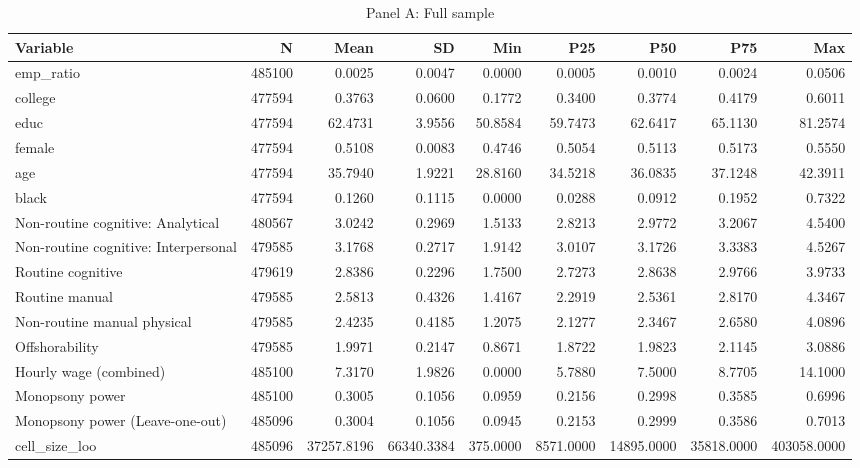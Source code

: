 \begin{table}

\caption{Panel A: Full sample}
\centering
\begin{tabular}[t]{lrrrrrrrr}
\toprule
Variable & N & Mean & SD & Min & P25 & P50 & P75 & Max\\
\midrule
emp\_ratio & 485100 & 0.0025 & 0.0047 & 0.0000 & 0.0005 & 0.0010 & 0.0024 & 0.0506\\
college & 477594 & 0.3763 & 0.0600 & 0.1772 & 0.3400 & 0.3774 & 0.4179 & 0.6011\\
educ & 477594 & 62.4731 & 3.9556 & 50.8584 & 59.7473 & 62.6417 & 65.1130 & 81.2574\\
female & 477594 & 0.5108 & 0.0083 & 0.4746 & 0.5054 & 0.5113 & 0.5173 & 0.5550\\
age & 477594 & 35.7940 & 1.9221 & 28.8160 & 34.5218 & 36.0835 & 37.1248 & 42.3911\\
\addlinespace
black & 477594 & 0.1260 & 0.1115 & 0.0000 & 0.0288 & 0.0912 & 0.1952 & 0.7322\\
Non-routine cognitive: Analytical & 480567 & 3.0242 & 0.2969 & 1.5133 & 2.8213 & 2.9772 & 3.2067 & 4.5400\\
Non-routine cognitive: Interpersonal & 479585 & 3.1768 & 0.2717 & 1.9142 & 3.0107 & 3.1726 & 3.3383 & 4.5267\\
Routine cognitive & 479619 & 2.8386 & 0.2296 & 1.7500 & 2.7273 & 2.8638 & 2.9766 & 3.9733\\
Routine manual & 479585 & 2.5813 & 0.4326 & 1.4167 & 2.2919 & 2.5361 & 2.8170 & 4.3467\\
\addlinespace
Non-routine manual physical & 479585 & 2.4235 & 0.4185 & 1.2075 & 2.1277 & 2.3467 & 2.6580 & 4.0896\\
Offshorability & 479585 & 1.9971 & 0.2147 & 0.8671 & 1.8722 & 1.9823 & 2.1145 & 3.0886\\
Hourly wage (combined) & 485100 & 7.3170 & 1.9826 & 0.0000 & 5.7880 & 7.5000 & 8.7705 & 14.1000\\
Monopsony power & 485100 & 0.3005 & 0.1056 & 0.0959 & 0.2156 & 0.2998 & 0.3585 & 0.6996\\
Monopsony power (Leave-one-out) & 485096 & 0.3004 & 0.1056 & 0.0945 & 0.2153 & 0.2999 & 0.3586 & 0.7013\\
\addlinespace
cell\_size\_loo & 485096 & 37257.8196 & 66340.3384 & 375.0000 & 8571.0000 & 14895.0000 & 35818.0000 & 403058.0000\\
\bottomrule
\end{tabular}
\end{table}
